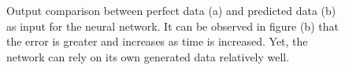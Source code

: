\documentclass[11pt]{article}
\begin{document}
% 

\begin{figure}[]
	\centering
		\caption{Output comparison between perfect data (a) and predicted data (b) as input for the neural network. It can be observed in figure (b) that the error is greater and increases as time is increased. Yet, the network can rely on its own generated data relatively well.}
	\label{fig:bpgt-3.0_damping_test_output_comp}	
\end{figure}
\end{document}

